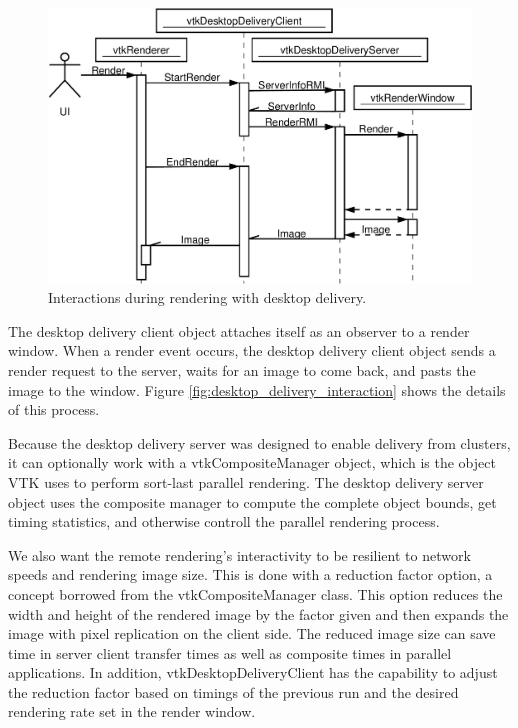 \documentclass[twocolumn]{article}
\begin{document}
\begin{figure}[ht]
  \begin{center}
    \includegraphics[scale=0.23]{images/DesktopDeliveryInteraction}
    \caption{Interactions during rendering with desktop delivery.}
    \label{fig:desktop_delivery_interaction}
  \end{center}
\end{figure}

The desktop delivery client object attaches itself as an observer to a
render window.  When a render event occurs, the desktop delivery client
object sends a render request to the server, waits for an image to come
back, and pasts the image to the window.  Figure
\vref{fig:desktop_delivery_interaction} shows the details of this process.

Because the desktop delivery server was designed to enable delivery from
clusters, it can optionally work with a vtkCompositeManager object, which
is the object VTK uses to perform sort-last parallel rendering.  The
desktop delivery server object uses the composite manager to compute the
complete object bounds, get timing statistics, and otherwise controll the
parallel rendering process.

We also want the remote rendering's interactivity to be resilient to
network speeds and rendering image size.  This is done with a reduction
factor option, a concept borrowed from the vtkCompositeManager class.  This
option reduces the width and height of the rendered image by the factor
given and then expands the image with pixel replication on the client side.
The reduced image size can save time in server client transfer times as
well as composite times in parallel applications.  In addition,
vtkDesktopDeliveryClient has the capability to adjust the reduction factor
based on timings of the previous run and the desired rendering rate set in
the render window.
\end{document}
